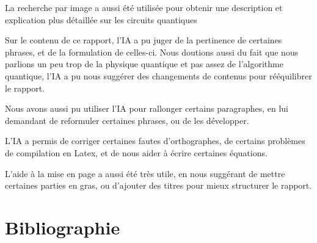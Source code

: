 \documentclass{article}
\begin{document}
La recherche par image a aussi été utilisée pour obtenir une description et explication plus détaillée sur les circuits quantiques

\medskip

Sur le contenu de ce rapport, l'IA a pu juger de la pertinence de certaines phrases, et de la formulation de celles-ci. Nous doutions aussi du fait que nous parlions un peu trop de la physique quantique et pas assez de l'algorithme quantique, l'IA a pu nous suggérer des changements de contenus pour rééquilibrer le rapport.

\medskip

Nous avons aussi pu utiliser l'IA pour rallonger certains paragraphes, en lui demandant de reformuler certaines phrases, ou de les développer.

L'IA a permis de corriger certaines fautes d'orthographes, de certains problèmes de compilation en Latex, et de nous aider à écrire certaines équations.

L'aide à la mise en page a aussi été très utile, en nous suggérant de mettre certaines parties en gras, ou d'ajouter des titres pour mieux structurer le rapport.


\break\section{Bibliographie}
\printbibliography
\end{document}
